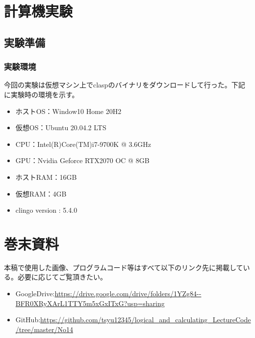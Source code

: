 \documentclass[dvipdfmx]{jsarticle}
\begin{document}
\section{計算機実験}
\subsection{実験準備}
  \subsubsection{実験環境}
  今回の実験は仮想マシン上でclaspのバイナリをダウンロードして行った。下記に実験時の環境を示す。
  \begin{itemize}
    \item ホストOS：Window10 Home 20H2
    \item 仮想OS：Ubuntu 20.04.2 LTS
    \item CPU：Intel(R)Core(TM)i7-9700K @ 3.6GHz
    \item GPU：Nvidia Geforce RTX2070 OC @ 8GB
    \item ホストRAM：16GB
    \item 仮想RAM：4GB
    \item clingo version : 5.4.0
  \end{itemize}

\section{巻末資料}
  本稿で使用した画像、プログラムコード等はすべて以下のリンク先に掲載している。必要に応じてご覧頂きたい。
  \begin{itemize}
    \item GoogleDrive:\url{https://drive.google.com/drive/folders/1YZg84--BFR0XRyXArL1TTY5m5xGxITxG?usp=sharing}
    \item GitHub:\url{https://github.com/tsyu12345/logical_and_calculating_LectureCode/tree/master/No14}
  \end{itemize}
\end{document}
